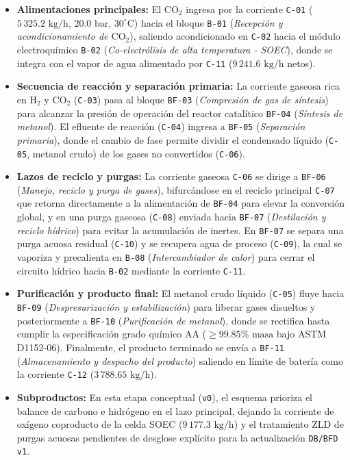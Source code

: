 \documentclass[11pt,letterpaper]{article}
\begin{document}
\begin{itemize}
  \item \textbf{Alimentaciones principales:} El $\mbox{CO}_2$ ingresa por la corriente \texttt{C-01} ($5\,325.2\mbox{ kg/h}$, $20.0\mbox{ bar}$, $30^\circ\mbox{C}$) hacia el bloque \texttt{B-01} (\textit{Recepción y acondicionamiento de $\mbox{CO}_2$}), saliendo acondicionado en \texttt{C-02} hacia el módulo electroquímico \texttt{B-02} (\textit{Co-electrólisis de alta temperatura - SOEC}), donde se integra con el vapor de agua alimentado por \texttt{C-11} ($9\,241.6\mbox{ kg/h}$ netos).
  \item \textbf{Secuencia de reacción y separación primaria:} La corriente gaseosa rica en $\mbox{H}_2$ y $\mbox{CO}_2$ (\texttt{C-03}) pasa al bloque \texttt{BF-03} (\textit{Compresión de gas de síntesis}) para alcanzar la presión de operación del reactor catalítico \texttt{BF-04} (\textit{Síntesis de metanol}). El efluente de reacción (\texttt{C-04}) ingresa a \texttt{BF-05} (\textit{Separación primaria}), donde el cambio de fase permite dividir el condensado líquido (\texttt{C-05}, metanol crudo) de los gases no convertidos (\texttt{C-06}).
  \item \textbf{Lazos de reciclo y purgas:} La corriente gaseosa \texttt{C-06} se dirige a \texttt{BF-06} (\textit{Manejo, reciclo y purga de gases}), bifurcándose en el reciclo principal \texttt{C-07} que retorna directamente a la alimentación de \texttt{BF-04} para elevar la conversión global, y en una purga gaseosa (\texttt{C-08}) enviada hacia \texttt{BF-07} (\textit{Destilación y reciclo hídrico}) para evitar la acumulación de inertes. En \texttt{BF-07} se separa una purga acuosa residual (\texttt{C-10}) y se recupera agua de proceso (\texttt{C-09}), la cual se vaporiza y precalienta en \texttt{B-08} (\textit{Intercambiador de calor}) para cerrar el circuito hídrico hacia \texttt{B-02} mediante la corriente \texttt{C-11}.
  \item \textbf{Purificación y producto final:} El metanol crudo líquido (\texttt{C-05}) fluye hacia \texttt{BF-09} (\textit{Despresurización y estabilización}) para liberar gases disueltos y posteriormente a \texttt{BF-10} (\textit{Purificación de metanol}), donde se rectifica hasta cumplir la especificación grado químico AA ($\ge 99.85\%\mbox{ masa}$ bajo ASTM D1152-06). Finalmente, el producto terminado se envía a \texttt{BF-11} (\textit{Almacenamiento y despacho del producto}) saliendo en límite de batería como la corriente \texttt{C-12} ($3\,788.65\mbox{ kg/h}$).
  \item \textbf{Subproductos:} En esta etapa conceptual (\texttt{v0}), el esquema prioriza el balance de carbono e hidrógeno en el lazo principal, dejando la corriente de oxígeno coproducto de la celda SOEC ($9\,177.3\mbox{ kg/h}$) y el tratamiento ZLD de purgas acuosas pendientes de desglose explícito para la actualización \texttt{DB/BFD v1}.
\end{itemize}
\end{document}
